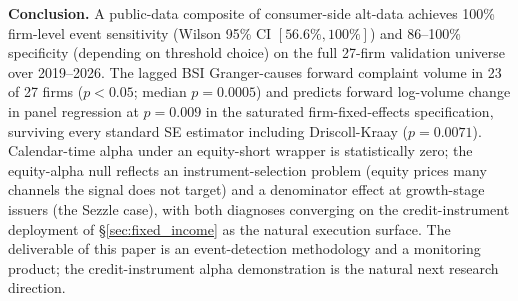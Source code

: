 \documentclass[11pt,a4paper]{article}
\begin{document}
\textbf{Conclusion.} A public-data composite of consumer-side alt-data achieves 100\% firm-level event sensitivity (Wilson 95\% CI $[56.6\%, 100\%]$) and 86--100\% specificity (depending on threshold choice) on the full 27-firm validation universe over 2019--2026. The lagged BSI Granger-causes forward complaint volume in 23 of 27 firms ($p < 0.05$; median $p = 0.0005$) and predicts forward log-volume change in panel regression at $p = 0.009$ in the saturated firm-fixed-effects specification, surviving every standard SE estimator including Driscoll-Kraay ($p = 0.0071$). Calendar-time alpha under an equity-short wrapper is statistically zero; the equity-alpha null reflects an instrument-selection problem (equity prices many channels the signal does not target) and a denominator effect at growth-stage issuers (the Sezzle case), with both diagnoses converging on the credit-instrument deployment of §\ref{sec:fixed_income} as the natural execution surface. The deliverable of this paper is an event-detection methodology and a monitoring product; the credit-instrument alpha demonstration is the natural next research direction.

\renewcommand{\bibsection}{\section{References}\label{sec:refs}}
\end{document}
